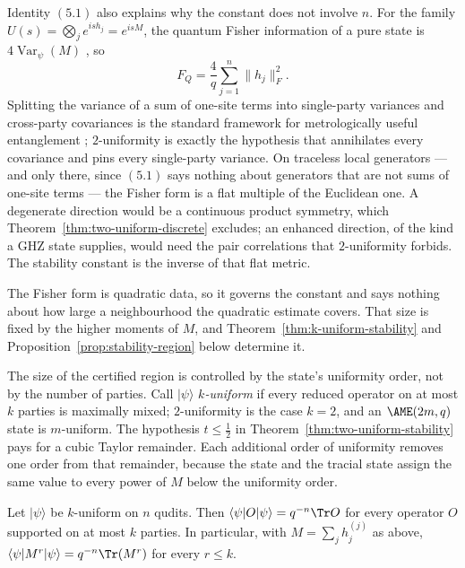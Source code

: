 \begin{remark}
\label{rem:fisher-isotropy}
Identity \((5.1)\) also explains why the constant does not involve \(n\).
For the family \(U(s)=\bigotimes_je^{ish_j}=e^{isM}\), the quantum Fisher
information of a pure state is \(4\operatorname{Var}_\psi(M)\)
\cite{BraunsteinCaves1994}, so
\[
 F_Q=\frac4q\sum_{j=1}^n\lVert h_j\rVert_F^2 .
\]
Splitting the variance of a sum of one-site terms into single-party
variances and cross-party covariances is the standard framework for
metrologically useful entanglement
\cite{HyllusEtAl2012,Toth2012}; \(2\)-uniformity is exactly the hypothesis
that annihilates every covariance and pins every single-party variance.  On
traceless local generators --- and only there, since \((5.1)\) says
nothing about generators that are not sums of one-site terms --- the Fisher
form is a flat multiple of the Euclidean one.  A degenerate direction would
be a continuous product symmetry, which
Theorem~\ref{thm:two-uniform-discrete} excludes; an enhanced direction, of
the kind a GHZ state supplies, would need the pair correlations that
\(2\)-uniformity forbids.  The stability constant is the inverse of that
flat metric.

The Fisher form is quadratic data, so it governs the constant and says
nothing about how large a neighbourhood the quadratic estimate covers.
That size is fixed by the higher moments of \(M\), and
Theorem~\ref{thm:k-uniform-stability} and
Proposition~\ref{prop:stability-region} below determine it.
\end{remark}

The size of the certified region is controlled by the state's uniformity
order, not by the number of parties.  Call
\(\lvert\psi\rangle\) \emph{\(k\)-uniform} if every reduced operator on at
most \(k\) parties is maximally mixed; \(2\)-uniformity is the case
\(k=2\), and an \(\AME(2m,q)\) state is \(m\)-uniform.  The hypothesis
\(t\leq\frac12\) in Theorem~\ref{thm:two-uniform-stability} pays for a
cubic Taylor remainder.  Each additional order of uniformity removes one
order from that remainder, because the state and the tracial state assign
the same value to every power of \(M\) below the uniformity order.

\begin{lemma}
\label{lem:tracial-agreement}
Let \(\lvert\psi\rangle\) be \(k\)-uniform on \(n\) qudits.  Then
\(\langle\psi\rvert O\lvert\psi\rangle=q^{-n}\Tr O\) for every operator
\(O\) supported on at most \(k\) parties.  In particular, with
\(M=\sum_jh_j^{(j)}\) as above,
\(\langle\psi\rvert M^r\lvert\psi\rangle=q^{-n}\Tr(M^r)\) for every
\(r\leq k\).
\end{lemma}

